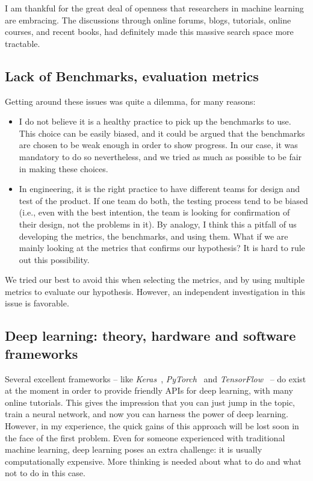     \par I am thankful for the great deal of openness that researchers in machine learning are embracing. The discussions through online forums, blogs, tutorials, online courses, and recent books, had definitely made this massive search space more tractable.

  \subsection{Lack of Benchmarks, evaluation metrics}
    Getting around these issues was quite a dilemma, for many reasons:

      \begin{itemize}
        \item I do not believe it is a healthy practice to pick up the benchmarks to use. This choice can be easily biased, and it could be argued that the benchmarks are chosen to be weak enough in order to show progress. In our case, it was mandatory to do so nevertheless, and we tried as much as possible to be fair in making these choices.
        \item In engineering, it is the right practice to have different teams for design and test of the product. If one team do both, the testing process tend to be biased (i.e., even with the best intention, the team is looking for confirmation of their design, not the problems in it). By analogy, I think this a pitfall of us developing the metrics, the benchmarks, and using them. What if we are mainly looking at the metrics that confirms our hypothesis? It is hard to rule out this possibility.
      \end{itemize}

    We tried our best to avoid this when selecting the metrics, and by using multiple metrics to evaluate our hypothesis. However, an independent investigation in this issue is favorable.

  \subsection{Deep learning: theory, hardware and software frameworks}
    \par Several excellent frameworks -- like \textit{Keras}~\citep{chollet2015keras}, \textit{PyTorch}~\citep{paszke2017automatic} and \textit{TensorFlow}~\citep{tensorflow2015-whitepaper} -- do exist at the moment in order to provide friendly APIs for deep learning, with many online tutorials. This gives the impression that you can just jump in the topic, train a neural network, and now you can harness the power of deep learning. However, in my experience, the quick gains of this approach will be lost soon in the face of the first problem. Even for someone experienced with traditional machine learning, deep learning poses an extra challenge: it is usually computationally expensive. More thinking is needed about what to do and what not to do in this case.

